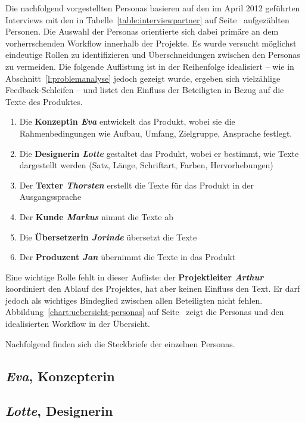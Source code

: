Die nachfolgend vorgestellten Personas basieren auf den im April 2012 geführten Interviews mit den in Tabelle~\ref{table:interviewpartner} auf Seite~\pageref{table:interviewpartner} aufgezählten Personen. Die Auswahl der Personas orientierte sich dabei primäre an dem vorherrschenden Workflow innerhalb der Projekte. Es wurde versucht möglichst eindeutige Rollen zu identifizieren und Überschneidungen zwischen den Personas zu vermeiden. Die folgende Auflistung ist in der Reihenfolge idealisiert -- wie in Abschnitt~\ref{l:problemanalyse} jedoch gezeigt wurde, ergeben sich vielzählige Feedback-Schleifen -- und listet den Einfluss der Beteiligten in Bezug auf die Texte des Produktes.

\begin{enumerate}
\item Die \textbf{Konzeptin \emph{Eva}} entwickelt das Produkt, wobei sie die Rahmenbedingungen wie Aufbau, Umfang, Zielgruppe, Ansprache festlegt. 
\item Die \textbf{Designerin \emph{Lotte}} gestaltet das Produkt, wobei er bestimmt, wie Texte dargestellt werden (Satz, Länge, Schriftart, Farben, Hervorhebungen)
\item Der \textbf{Texter \emph{Thorsten}} erstellt die Texte für das Produkt in der Ausgangssprache
\item Der \textbf{Kunde \emph{Markus}} nimmt die Texte ab
\item Die \textbf{Übersetzerin \emph{Jorinde}} übersetzt die Texte
\item Der \textbf{Produzent \emph{Jan}} übernimmt die Texte in das Produkt
\end{enumerate}

Eine wichtige Rolle fehlt in dieser Aufliste: der \textbf{Projektleiter \emph{Arthur}} koordiniert den Ablauf des Projektes, hat aber keinen Einfluss den Text. Er darf jedoch als wichtiges Bindeglied zwischen allen Beteiligten  nicht fehlen. Abbildung~\ref{chart:uebersicht-personas} auf Seite~\pageref{chart:uebersicht-personas} zeigt die Personas und den idealisierten Workflow in der Übersicht.

\bigskip

Nachfolgend finden sich die Steckbriefe der einzelnen Personas.

\subsection{\emph{Eva}, Konzepterin}\label{p:eva}

\subsection{\emph{Lotte}, Designerin}\label{p:lotte}

